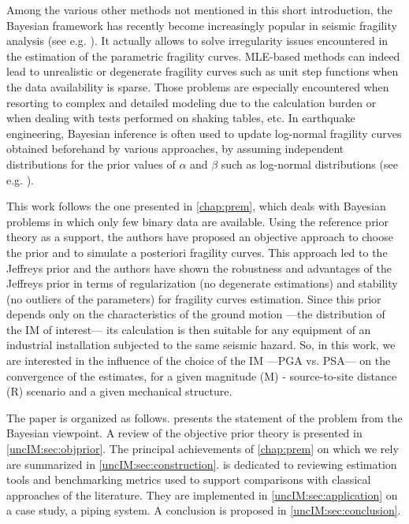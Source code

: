 Among the various other methods not mentioned in this short introduction, the Bayesian framework has recently become increasingly popular in seismic fragility analysis (see e.g. \cite{gardoni_probabilistic_2002,wang_seismic_2018,katayama_bayesian-estimation-based_2021,koutsourelakis_assessing_2010,damblin_approche_2014,tadinada_structural_2017,kwag_computationally_2018,jeon_parameterized_2019,tabandeh_physics-based_2020}). 
It actually allows to solve irregularity issues encountered in the estimation of the parametric fragility curves. MLE-based methods can indeed lead to unrealistic or degenerate fragility curves such as unit step functions when the data availability is sparse. Those problems are especially encountered when resorting to complex and detailed modeling due to the calculation burden or when dealing with tests performed on shaking tables, etc. In earthquake engineering, Bayesian inference is often used to update log-normal fragility curves obtained beforehand by various approaches, by assuming independent distributions for the prior values of $\alpha$ and $\beta$ such as log-normal distributions (see e.g. \cite{tadinada_structural_2017,kwag_computationally_2018,wang_seismic_2018,katayama_bayesian-estimation-based_2021,straub_improved_2008}).

This work follows the one presented in \cref{chap:prem}, which deals with Bayesian problems in which only few binary data are available. Using the reference prior theory as a support, the authors have proposed an objective approach to choose the prior and to simulate a posteriori fragility curves. This approach led to the Jeffreys prior and the authors have shown the robustness and advantages of the Jeffreys prior in terms of regularization (no degenerate estimations) and stability (no outliers of the parameters) for fragility curves estimation. Since this prior depends only on the characteristics of the ground motion ---the distribution of the IM of interest--- its calculation is then suitable for any equipment of an industrial installation subjected to the same seismic hazard. So, in this work, we are interested in the influence of the choice of the IM ---PGA vs. PSA--- on the convergence of the estimates, for a given magnitude (M) - source-to-site distance (R) scenario and a given mechanical structure.

The paper is organized as follows.  presents the statement of the problem from the Bayesian viewpoint. A review of the objective prior theory is presented in \cref{uncIM:sec:objprior}. The principal achievements of \cref{chap:prem} on which we rely are summarized in \cref{uncIM:sec:construction}.  is dedicated to reviewing estimation tools and benchmarking metrics used to support comparisons with classical approaches of the literature. They are implemented in \cref{uncIM:sec:application} on a case study, a piping system. A conclusion is proposed in \cref{uncIM:sec:conclusion}.





